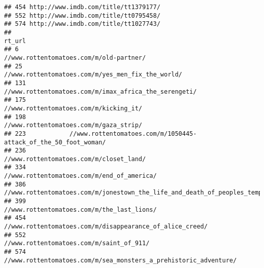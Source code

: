 \documentclass[]{article}
\newenvironment{Shaded}{\begin{snugshade}}{\end{snugshade}}
\newcommand{\CommentTok}[1]{\textcolor[rgb]{0.56,0.35,0.01}{\textit{#1}}}
\newcommand{\KeywordTok}[1]{\textcolor[rgb]{0.13,0.29,0.53}{\textbf{#1}}}
\newcommand{\NormalTok}[1]{#1}
\newcommand{\OperatorTok}[1]{\textcolor[rgb]{0.81,0.36,0.00}{\textbf{#1}}}
\newcommand{\StringTok}[1]{\textcolor[rgb]{0.31,0.60,0.02}{#1}}
\begin{document}
\begin{verbatim}
## 454 http://www.imdb.com/title/tt1379177/
## 552 http://www.imdb.com/title/tt0795458/
## 574 http://www.imdb.com/title/tt1027743/
##                                                                         rt_url
## 6                                      //www.rottentomatoes.com/m/old-partner/
## 25                           //www.rottentomatoes.com/m/yes_men_fix_the_world/
## 131                      //www.rottentomatoes.com/m/imax_africa_the_serengeti/
## 175                                     //www.rottentomatoes.com/m/kicking_it/
## 198                                     //www.rottentomatoes.com/m/gaza_strip/
## 223            //www.rottentomatoes.com/m/1050445-attack_of_the_50_foot_woman/
## 236                                    //www.rottentomatoes.com/m/closet_land/
## 334                                 //www.rottentomatoes.com/m/end_of_america/
## 386 //www.rottentomatoes.com/m/jonestown_the_life_and_death_of_peoples_temple/
## 399                                 //www.rottentomatoes.com/m/the_last_lions/
## 454                   //www.rottentomatoes.com/m/disappearance_of_alice_creed/
## 552                                   //www.rottentomatoes.com/m/saint_of_911/
## 574           //www.rottentomatoes.com/m/sea_monsters_a_prehistoric_adventure/
\end{verbatim}

\begin{Shaded}
\end{Shaded}
\end{document}
